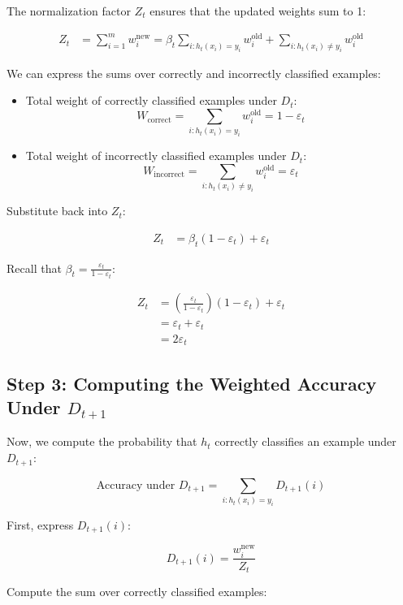 \documentclass{article}
\begin{document}
The normalization factor $Z_t$ ensures that the updated weights sum to 1:

\begin{align*}
Z_t &= \sum_{i=1}^m w_i^{\text{new}} = \beta_t \sum_{i: h_t(x_i) = y_i} w_i^{\text{old}} + \sum_{i: h_t(x_i) \neq y_i} w_i^{\text{old}}
\end{align*}

We can express the sums over correctly and incorrectly classified examples:

\begin{itemize}
    \item Total weight of correctly classified examples under $D_t$:
    \[W_{\text{correct}} = \sum_{i: h_t(x_i) = y_i} w_i^{\text{old}} = 1 - \varepsilon_t\]
    \item Total weight of incorrectly classified examples under $D_t$:
    \[W_{\text{incorrect}} = \sum_{i: h_t(x_i) \neq y_i} w_i^{\text{old}} = \varepsilon_t\]
\end{itemize}

Substitute back into $Z_t$:

\begin{align*}
Z_t &= \beta_t (1 - \varepsilon_t) + \varepsilon_t
\end{align*}

Recall that $\beta_t = \frac{\varepsilon_t}{1 - \varepsilon_t}$:

\begin{align*}
Z_t &= \left( \frac{\varepsilon_t}{1 - \varepsilon_t} \right)(1 - \varepsilon_t) + \varepsilon_t \\
&= \varepsilon_t + \varepsilon_t \\
&= 2\varepsilon_t
\end{align*}

\subsection*{Step 3: Computing the Weighted Accuracy Under $D_{t+1}$}

Now, we compute the probability that $h_t$ correctly classifies an example under $D_{t+1}$:

\[
\text{Accuracy under } D_{t+1} = \sum_{i: h_t(x_i) = y_i} D_{t+1}(i)
\]

First, express $D_{t+1}(i)$:

\[
D_{t+1}(i) = \frac{w_i^{\text{new}}}{Z_t}
\]

Compute the sum over correctly classified examples:
\end{document}
